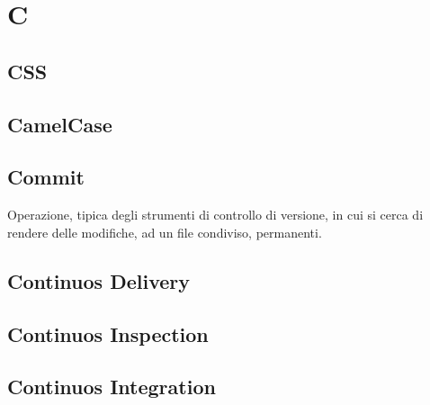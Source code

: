 \section*{C}

\subsection{CSS}

\subsection{CamelCase}

\subsection{Commit}
Operazione, tipica degli strumenti di controllo di versione, in cui si cerca di rendere delle modifiche, ad un file condiviso, permanenti.

\subsection{Continuos Delivery}

\subsection{Continuos Inspection}

\subsection{Continuos Integration}

